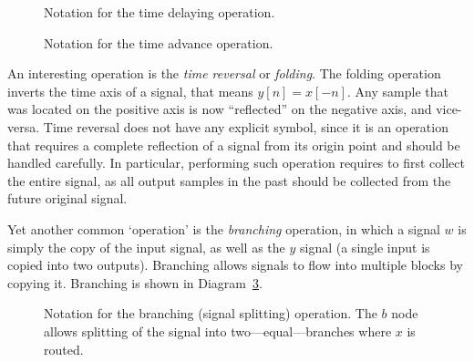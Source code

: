 \documentclass[\documentfontsize, twocolumn]{\classname}
\begin{document}
\begin{figure}[ht]
\begin{center}
    \caption{Notation for the time delaying operation.}\label{tikz:delaying-operation}
\end{center}
\end{figure}

\begin{figure}[ht]
\begin{center}
    \caption{Notation for the time advance operation.}\label{tikz:advance-operation}
\end{center}
\end{figure}

An interesting operation is the \emph{time reversal} or \emph{folding}. The folding operation inverts the time axis of a signal, that means $y[n] = x[-n]$. Any sample that was located on the positive axis is now ``reflected'' on the negative axis, and vice-versa. Time reversal does not have any explicit symbol, since it is an operation that requires a complete reflection of a signal from its origin point and should be handled carefully. In particular, performing such operation requires to first collect the entire signal, as all output samples in the past should be collected from the future original signal.

Yet another common `operation' is the \emph{branching} operation, in which a signal $w$ is simply the copy of the input signal, as well as the $y$ signal (a single input is copied into two outputs). Branching allows signals to flow into multiple blocks by copying it. Branching is shown in Diagram~\ref{tikz:branchingOperation}.
\begin{figure}[ht]
\begin{center}
    \caption{Notation for the branching (signal splitting) operation. The $b$ node allows splitting of the signal into two---equal---branches where $x$ is routed.}\label{tikz:branchingOperation}
\end{center}
\end{figure}
\end{document}
